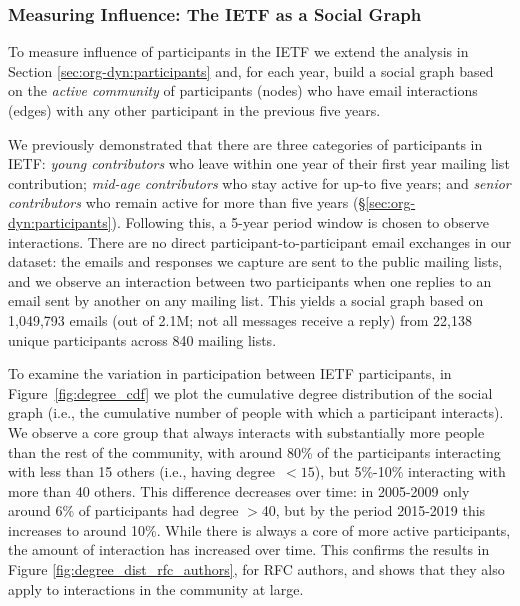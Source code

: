 \documentclass[twocolumn,10pt]{article}
\newcommand{\pb}[1]{\vspace{0.75ex}\noindent{\textbf{#1}}}
\begin{document}
\subsubsection{Measuring Influence: The IETF as a Social Graph}
\label{subsec:measuring_influence}


To measure influence of participants in the IETF we extend the analysis in
Section \ref{sec:org-dyn:participants} and, for each year, build a social
graph based on the \emph{active community} of participants (nodes) who have
email interactions (edges) with any other participant in the previous five
years. 

We previously demonstrated that there are three categories of participants
in IETF: \textit{young contributors} who leave within one year of their
first year mailing list contribution; \textit{mid-age contributors} who
stay active for up-to five years; and \textit{senior contributors} who
remain active for more than five years (\S\ref{sec:org-dyn:participants}).
Following this, a 5-year period window is chosen to observe interactions.
There are no direct participant-to-participant email exchanges in our
dataset: the emails and responses we capture are sent to the public mailing
lists, and we observe an interaction between two participants when one
replies to an email sent by another on any mailing list. This yields a
social graph based on 1,049,793 emails (out of 2.1M; not all messages
receive a reply) from 22,138 unique participants across 840 mailing lists.

\pb{Participation}
To examine the variation in participation between IETF participants, in
Figure~\ref{fig:degree_cdf} we plot the cumulative degree distribution
of the social graph (i.e., the cumulative number of people with which a
participant interacts). We observe a core group that always interacts with
substantially more people than the rest of the community, with around 80\%
of the participants interacting with less than 15 others (i.e., having
degree~$<15$), but 5\%-10\% interacting with more than 40 others.
This difference decreases over time: in 2005-2009 only around 6\% of
participants had degree $>$40, but by the period 2015-2019 this increases
to around 10\%.
While there is always a core of more active participants, the amount of
interaction has increased over time.
This confirms the results in Figure \ref{fig:degree_dist_rfc_authors},
for RFC authors, and shows that they also apply to interactions in the
community at large.
\end{document}
